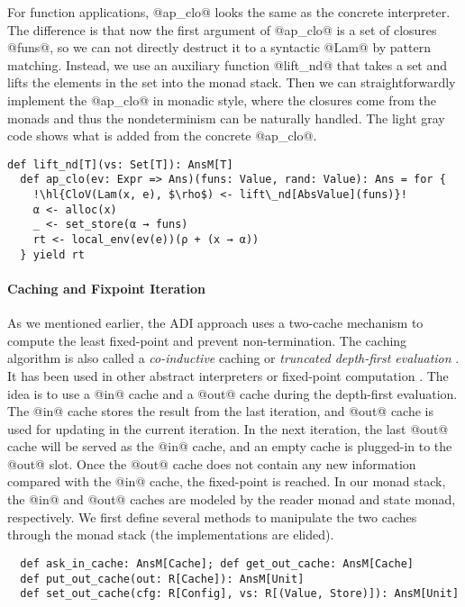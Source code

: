 For function applications, @ap_clo@ looks the same as the concrete interpreter.
The difference is that now the first argument of @ap_clo@ is a set of closures
@funs@, so we can not directly destruct it to a syntactic @Lam@ by pattern
matching. Instead, we use an auxiliary function @lift_nd@ that takes a set and
lifts the elements in the set into the monad stack. Then we can
straightforwardly implement the @ap_clo@ in monadic style, where the closures
come from the monads and thus the nondeterminism can be naturally handled. The
light gray code shows what is added from the concrete @ap_clo@.
\begin{lstlisting}[escapechar=!]
  def lift_nd[T](vs: Set[T]): AnsM[T]
  def ap_clo(ev: Expr => Ans)(funs: Value, rand: Value): Ans = for {
    !\hl{CloV(Lam(x, e), $\rho$) <- lift\_nd[AbsValue](funs)}!
    α <- alloc(x)
    _ <- set_store(α → funs)
    rt <- local_env(ev(e))(ρ + (x → α))
  } yield rt
\end{lstlisting}

\paragraph{Caching and Fixpoint Iteration}
As we mentioned earlier, the ADI approach uses a two-cache mechanism to
compute the least fixed-point and prevent non-termination.
The caching algorithm is also called a \textit{co-inductive} caching or
\textit{truncated depth-first evaluation} \cite{Rosendahl:AbsIntPL}. It has
been used in other abstract interpreters or fixed-point computation
\cite{DBLP:journals/pacmpl/DaraisLNH17, Wei:2018:RAA:3243631.3236800,
  Rosendahl:AbsIntPL}. The idea is to use a @in@ cache and a @out@ cache during
the depth-first evaluation. The @in@ cache stores the result from the last
iteration, and @out@ cache is used for updating in the current iteration. In
the next iteration, the last @out@ cache will be served as the @in@ cache, and
an empty cache is plugged-in to the @out@ slot. Once the @out@ cache does not
contain any new information compared with the @in@ cache, the fixed-point is
reached.
In our monad stack, the @in@ and @out@ caches are modeled by the reader monad and
state monad, respectively. We first define several methods to manipulate
the two caches through the monad stack (the implementations are elided).
\begin{lstlisting}
  def ask_in_cache: AnsM[Cache]; def get_out_cache: AnsM[Cache]
  def put_out_cache(out: R[Cache]): AnsM[Unit]
  def set_out_cache(cfg: R[Config], vs: R[(Value, Store)]): AnsM[Unit]
\end{lstlisting}

